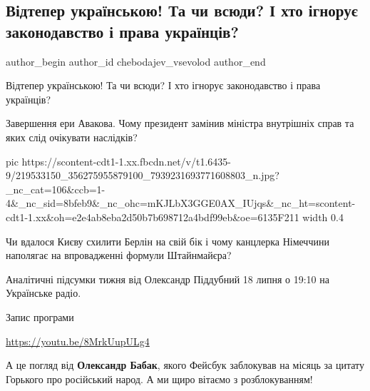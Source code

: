  
 
 
 
 
 
\subsection{Відтепер українською! Та чи всюди? І хто ігнорує законодавство і права українців?}
\label{sec:18_07_2021.fb.chebodajev_vsevolod.1.ukrainizacia_film_foto}
 
\ifcmt
 author_begin
   author_id chebodajev_vsevolod
 author_end
\fi

Відтепер українською! Та чи всюди? І хто ігнорує законодавство і права
українців? 

Завершення ери Авакова. Чому президент замінив міністра внутрішніх справ та
яких слід очікувати наслідків?

\ifcmt
  pic https://scontent-cdt1-1.xx.fbcdn.net/v/t1.6435-9/219533150_356275955879100_7939231693771608803_n.jpg?_nc_cat=106&ccb=1-4&_nc_sid=8bfeb9&_nc_ohc=mKJLbX3GGE0AX_IUjqs&_nc_ht=scontent-cdt1-1.xx&oh=e2e4ab8eba2d50b7b698712a4bdf99eb&oe=6135F211
  width 0.4
\fi

Чи вдалося Києву схилити Берлін на свій бік і чому канцлерка Німеччини
наполягає на впровадженні формули Штайнмайєра?

Аналітичні підсумки тижня від Олександр Піддубний 18 липня о 19:10 на
Українське радіо.

Запис програми

\url{https://youtu.be/8MrkUupULg4}

А це погляд від \textbf{Олександр Бабак}, якого Фейсбук заблокував на місяць за
цитату Горького про російський народ. А ми щиро вітаємо з розблокуванням!

